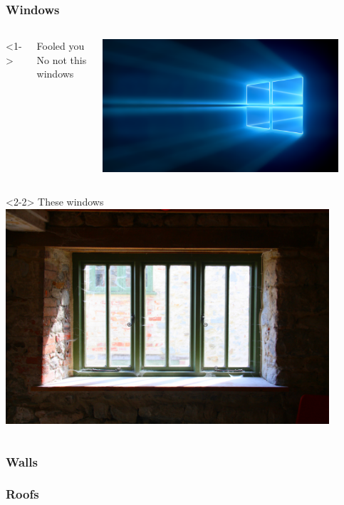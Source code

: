 \documentclass[]{beamer}
\begin{document}
\begin{frame}
  \frametitle{Windows}
  \begin{columns}[c]<1->
    \begin{block}{Fooled you}
      No not this windows
    \end{block}
    \includegraphics[width=0.9\textwidth]{Windows_10_Hero}
  \end{columns}
  \vspace{1mm}
  \begin{columns}[c]<2-2>
    These windows
    \includegraphics[width=0.9\textwidth]{Window}
  \end{columns}
\end{frame}

\begin{frame}
  \frametitle{Walls}
\end{frame}

\begin{frame}
  \frametitle{Roofs}
\end{frame}
\end{document}
